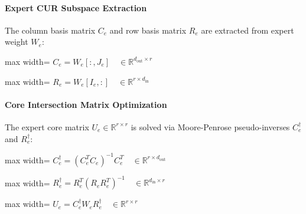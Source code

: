 \paragraph{Expert CUR Subspace Extraction}
The column basis matrix $C_e$ and row basis matrix $R_e$ are extracted from expert weight $W_e$:

\begin{center}
\begin{adjustbox}{max width=\columnwidth}
$\displaystyle
C_e = W_e[:, J_e] \quad \in \mathbb{R}^{d_{\text{out}} \times r}
$
\end{adjustbox}
\end{center}

\begin{center}
\begin{adjustbox}{max width=\columnwidth}
$\displaystyle
R_e = W_e[I_e, :] \quad \in \mathbb{R}^{r \times d_{\text{in}}}
$
\end{adjustbox}
\end{center}

\paragraph{Core Intersection Matrix Optimization}
The expert core matrix $U_e \in \mathbb{R}^{r \times r}$ is solved via Moore-Penrose pseudo-inverses $C_e^\dagger$ and $R_e^\dagger$:

\begin{center}
\begin{adjustbox}{max width=\columnwidth}
$\displaystyle
C_e^\dagger = (C_e^T C_e)^{-1} C_e^T \quad \in \mathbb{R}^{r \times d_{\text{out}}}
$
\end{adjustbox}
\end{center}

\begin{center}
\begin{adjustbox}{max width=\columnwidth}
$\displaystyle
R_e^\dagger = R_e^T (R_e R_e^T)^{-1} \quad \in \mathbb{R}^{d_{\text{in}} \times r}
$
\end{adjustbox}
\end{center}

\begin{center}
\begin{adjustbox}{max width=\columnwidth}
$\displaystyle
U_e = C_e^\dagger W_e R_e^\dagger \quad \in \mathbb{R}^{r \times r}
$
\end{adjustbox}
\end{center}

